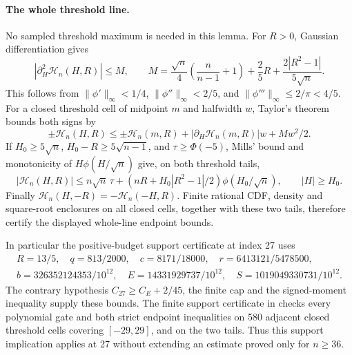 \documentclass[11pt,a4paper]{article}
\numberwithin{equation}{section}
\theoremstyle{definition}
\theoremstyle{remark}
\begin{document}
\paragraph{The whole threshold line.}
No sampled threshold maximum is needed in this lemma.
For \(R>0\), Gaussian differentiation gives
\[
 |\partial_H^2\mathcal H_n(H,R)|\le M,\qquad
 M=\frac{\sqrt n}{4}\left(\frac n{n-1}+1\right)
       +\frac25R+\frac{2|R^2-1|}{5\sqrt n}.
\]
This follows from \(\|\phi'\|_\infty<1/4\),
\(\|\phi''\|_\infty<2/5\), and
\(\|\phi'''\|_\infty\le2/\pi<4/5\).
For a closed threshold cell of midpoint \(m\) and halfwidth \(w\),
Taylor's theorem bounds both signs by
\[
 \pm\mathcal H_n(H,R)
 \le\pm\mathcal H_n(m,R)
       +|\partial_H\mathcal H_n(m,R)|w+Mw^2/2.
\]
If \(H_0\ge5\sqrt n\), \(H_0-R\ge5\sqrt{n-1}\), and
\(\tau\ge\Phi(-5)\), Mills' bound and monotonicity of
\(H\phi(H/\sqrt n)\) give, on both threshold tails,
\[
 |\mathcal H_n(H,R)|\le n\sqrt n\,\tau
 +(nR+H_0|R^2-1|/2)\phi(H_0/\sqrt n),\qquad |H|\ge H_0.
\]
Finally \(\mathcal H_n(H,-R)=-\mathcal H_n(-H,R)\).
Finite rational CDF, density and square-root enclosures on all
closed cells, together with these two tails, therefore certify
the displayed whole-line endpoint bounds.

In particular the positive-budget support certificate at index 27
uses
\[
 \begin{gathered}
 R=13/5,\quad q=813/2000,\quad c=8171/18000,\quad
 r=6413121/5478500,\\
 b=326352124353/10^{12},\quad E=14331929737/10^{12},\quad
 S=1019049330731/10^{12}.
 \end{gathered}
\]
The contrary hypothesis \(C_{27}\ge C_E+2/45\), the finite
cap and the signed-moment inequality supply these bounds.
The finite support certificate in \cite{EffectiveSupplement}
checks every polynomial gate and both strict endpoint inequalities
on 580 adjacent closed threshold cells covering \([-29,29]\),
and on the two tails. Thus this support implication applies
at 27 without extending an estimate proved only for \(n\ge36\).
\end{document}
